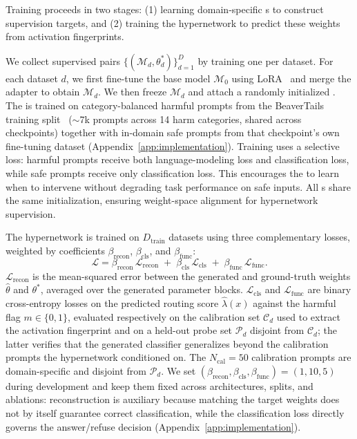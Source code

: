 Training proceeds in two stages: (1) learning domain-specific \ssn{}s to construct supervision targets, and (2) training the hypernetwork to predict these weights from activation fingerprints.

\label{sec:gt}
We collect supervised pairs $\{(\mathcal{M}_d, \theta_d^*)\}_{d=1}^D$ by training one \ssn{} per dataset. For each dataset $d$, we first fine-tune the base model $\mathcal{M}_0$ using LoRA~\citep{hu2022lora} and merge the adapter to obtain $\mathcal{M}_d$. We then freeze $\mathcal{M}_d$ and attach a randomly initialized \ssn{}. The \ssn{} is trained on category-balanced harmful prompts from the BeaverTails training split~\citep{ji2024beavertails} ($\sim$7k prompts across 14 harm categories, shared across checkpoints) together with in-domain safe prompts from that checkpoint's own fine-tuning dataset (Appendix~\ref{app:implementation}).
Training uses a selective loss: harmful prompts receive both language-modeling loss and classification loss, while safe prompts receive only classification loss. This encourages the \ssn{} to learn when to intervene without degrading task performance on safe inputs. All \ssn{}s share the same initialization, ensuring weight-space alignment for hypernetwork supervision.

 The hypernetwork is trained on $D_\text{train}$ datasets using three complementary losses, weighted by coefficients $\beta_\text{recon}$, $\beta_\text{cls}$, and $\beta_\text{func}$:
\begin{equation}
    \mathcal{L} = \beta_\text{recon}\,\mathcal{L}_\text{recon} \;+\; \beta_\text{cls}\,\mathcal{L}_\text{cls} \;+\; \beta_\text{func}\,\mathcal{L}_\text{func}.
\end{equation}
$\mathcal{L}_\text{recon}$ is the mean-squared error between the generated and ground-truth \ssn{} weights $\hat\theta$ and $\theta^*$, averaged over the generated parameter blocks. $\mathcal{L}_\text{cls}$ and $\mathcal{L}_\text{func}$ are binary cross-entropy losses on the predicted routing score $\hat\lambda(x)$ against the harmful flag $m\in\{0,1\}$, evaluated respectively on the calibration set $\mathcal{C}_d$ used to extract the activation fingerprint and on a held-out probe set $\mathcal{P}_d$ disjoint from $\mathcal{C}_d$; the latter verifies that the generated classifier generalizes beyond the calibration prompts the hypernetwork conditioned on. The $N_\text{cal}{=}50$ calibration prompts are domain-specific and disjoint from $\mathcal{P}_d$. We set $(\beta_\text{recon},\beta_\text{cls},\beta_\text{func})=(1,10,5)$ during development and keep them fixed across architectures, splits, and ablations: reconstruction is auxiliary because matching the target weights does not by itself guarantee correct classification, while the classification loss directly governs the answer/refuse decision (Appendix~\ref{app:implementation}).

